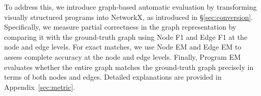 To address this, we introduce graph-based automatic evaluation by transforming visually structured programs into NetworkX, as introduced in \S\ref{sec:conversion}. Specifically, we measure partial correctness in the graph representation by comparing it with the ground-truth graph using Node F1 and Edge F1 at the node and edge levels. For exact matches, we use Node EM and Edge EM to assess complete accuracy at the node and edge levels. Finally, Program EM evaluates whether the entire graph matches the ground-truth graph precisely in terms of both nodes and edges. Detailed explanations are provided in Appendix~\ref{sec:metric}.